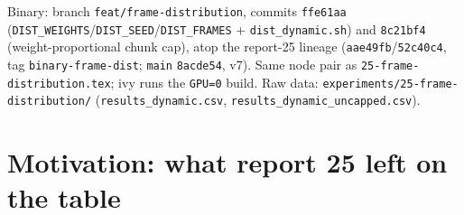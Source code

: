\documentclass[
	english,
	letterpaper, oneside
]{article}
\begin{document}
\templatePagecfg
\templateFinalcfg

\inserttitle

\begin{center}\small\textsf{%
Binary: branch \texttt{feat/frame-distribution}, commits \texttt{ffe61aa}
(\texttt{DIST\_WEIGHTS}/\texttt{DIST\_SEED}/\texttt{DIST\_FRAMES} +
\texttt{dist\_dynamic.sh}) and \texttt{8c21bf4} (weight-proportional chunk
cap), atop the report-25 lineage (\texttt{aae49fb}/\texttt{52c40c4}, tag
\texttt{binary-frame-dist}; \texttt{main} \texttt{8acde54}, v7). Same node
pair as \texttt{25-frame-distribution.tex}; ivy runs the \texttt{GPU=0}
build. Raw data: \texttt{experiments/25-frame-distribution/}
(\texttt{results\_dynamic.csv}, \texttt{results\_dynamic\_uncapped.csv}).%
}\end{center}

\begin{abstract}
Report~25 ended with an analytic verdict: on the laptop+ivy pair
($4.56\times$ per-frame throughput gap), no static equal-share assignment
can beat the laptop alone, and even a perfect weighted split is bounded at
$1.22\times$ ($15.4$~s) with $3.4$--$4.2$~s of orchestration overhead eating
half of that --- so \emph{parity} is the realistic target. This report
builds the two schedulers that verdict calls for and measures them. A
seeded weighted-random static assignment (\texttt{DIST\_WEIGHTS}, splitmix64
over the frame index --- communication-free, identical on every machine) and
a coordinator-driven work-stealing mode (guided chunks through the new
\texttt{DIST\_FRAMES} list interface; an empty node steals half the richest
undispatched tail). Both are \textbf{100/100 byte-identical} at production
scale, including a live corrective steal. With calibrated 5:1 weights both
reach \textbf{baseline parity} ($22.93\pm0.11$ and $22.01\pm0.56$~s vs.\ a
$21.06\pm2.73$~s baseline; equal-share static: $46.90$~s). With deliberately
wrong 1:1 weights, stealing recovers \textbf{72\%} of the miscalibration
penalty autonomously ($46.90 \to 28.18\pm0.37$~s) --- but only after fixing
the defect the first run exposed: an in-flight chunk is unstealable, so
chunks must be capped at $\mathrm{KCAP}\cdot w_r$ frames to bound every
node's exposure at the same wall-time budget.
\end{abstract}

\section{Motivation: what report 25 left on the table}
\label{sec:motivation}
\end{document}
